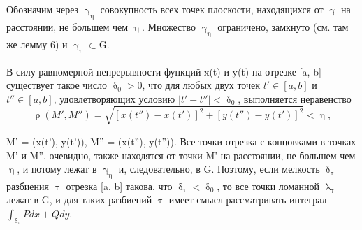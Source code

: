 \documentclass[a5paper, 11pt]{article}
\begin{document}
{ 

\\ \\
Обозначим через $\upgamma_\upeta$ совокупность всех точек плоскости, находящихся от $\upgamma$ на расстоянии, не большем чем $\upeta$. Множество $\upgamma_\upeta$ ограничено, замкнуто (см. там же лемму 6) и $\upgamma_\upeta{\subset}$G.
\par В силу равномерной непрерывности функций x(t) и y(t) на отрезке
[a, b] существует такое число $\updelta_0 > 0$, что для любых двух точек $t' \in[a,b]$ и $t''\in[a, b]$, удовлетворяющих условию $|t' - t''| < \updelta_0$, выполняется неравенство 
$$\uprho(M', M'')=\sqrt{[x(t'')-x(t')]^2+[y(t'')-y(t')]^2}<\upeta, $$

 M' = (x(t'), y(t')), M'' = (x(t''), y(t'')). Все точки отрезка с концовками в точках M' и M'', очевидно, также находятся от точки M' на расстоянии, не большем чем $\upeta$, и потому лежат в $\upgamma_\upeta$ и, следовательно, в G. Поэтому, если мелкость $\updelta_\uptau$ разбиения $\uptau$ отрезка [a, b] такова, что $\updelta_\uptau < \updelta_0$, то все точки ломанной $\uplambda_\uptau$ лежат в G, и для таких разбиений $\uptau$ имеет смысл рассматривать интеграл $\int_{\updelta_\uptau}{Pdx}+ Qdy$.
}
\end{document}
